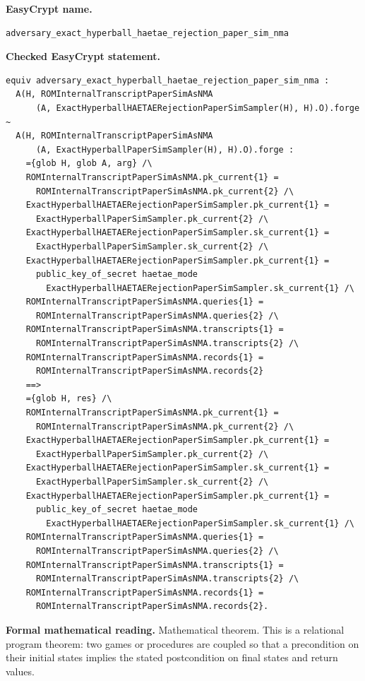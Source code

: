 \begin{formaltheorem}
\noindent\textbf{EasyCrypt name.}
\begin{lstlisting}[language=EasyCrypt,basicstyle=\ttfamily\scriptsize]
adversary_exact_hyperball_haetae_rejection_paper_sim_nma
\end{lstlisting}
\noindent\textbf{Checked EasyCrypt statement.}
\begin{lstlisting}[language=EasyCrypt,basicstyle=\ttfamily\scriptsize]
equiv adversary_exact_hyperball_haetae_rejection_paper_sim_nma :
  A(H, ROMInternalTranscriptPaperSimAsNMA
      (A, ExactHyperballHAETAERejectionPaperSimSampler(H), H).O).forge ~
  A(H, ROMInternalTranscriptPaperSimAsNMA
      (A, ExactHyperballPaperSimSampler(H), H).O).forge :
    ={glob H, glob A, arg} /\
    ROMInternalTranscriptPaperSimAsNMA.pk_current{1} =
      ROMInternalTranscriptPaperSimAsNMA.pk_current{2} /\
    ExactHyperballHAETAERejectionPaperSimSampler.pk_current{1} =
      ExactHyperballPaperSimSampler.pk_current{2} /\
    ExactHyperballHAETAERejectionPaperSimSampler.sk_current{1} =
      ExactHyperballPaperSimSampler.sk_current{2} /\
    ExactHyperballHAETAERejectionPaperSimSampler.pk_current{1} =
      public_key_of_secret haetae_mode
        ExactHyperballHAETAERejectionPaperSimSampler.sk_current{1} /\
    ROMInternalTranscriptPaperSimAsNMA.queries{1} =
      ROMInternalTranscriptPaperSimAsNMA.queries{2} /\
    ROMInternalTranscriptPaperSimAsNMA.transcripts{1} =
      ROMInternalTranscriptPaperSimAsNMA.transcripts{2} /\
    ROMInternalTranscriptPaperSimAsNMA.records{1} =
      ROMInternalTranscriptPaperSimAsNMA.records{2}
    ==>
    ={glob H, res} /\
    ROMInternalTranscriptPaperSimAsNMA.pk_current{1} =
      ROMInternalTranscriptPaperSimAsNMA.pk_current{2} /\
    ExactHyperballHAETAERejectionPaperSimSampler.pk_current{1} =
      ExactHyperballPaperSimSampler.pk_current{2} /\
    ExactHyperballHAETAERejectionPaperSimSampler.sk_current{1} =
      ExactHyperballPaperSimSampler.sk_current{2} /\
    ExactHyperballHAETAERejectionPaperSimSampler.pk_current{1} =
      public_key_of_secret haetae_mode
        ExactHyperballHAETAERejectionPaperSimSampler.sk_current{1} /\
    ROMInternalTranscriptPaperSimAsNMA.queries{1} =
      ROMInternalTranscriptPaperSimAsNMA.queries{2} /\
    ROMInternalTranscriptPaperSimAsNMA.transcripts{1} =
      ROMInternalTranscriptPaperSimAsNMA.transcripts{2} /\
    ROMInternalTranscriptPaperSimAsNMA.records{1} =
      ROMInternalTranscriptPaperSimAsNMA.records{2}.
\end{lstlisting}
\noindent\textbf{Formal mathematical reading.}
Mathematical theorem. This is a relational program theorem: two games or procedures are coupled so that a precondition on their initial states implies the stated postcondition on final states and return values.


\end{formaltheorem}
